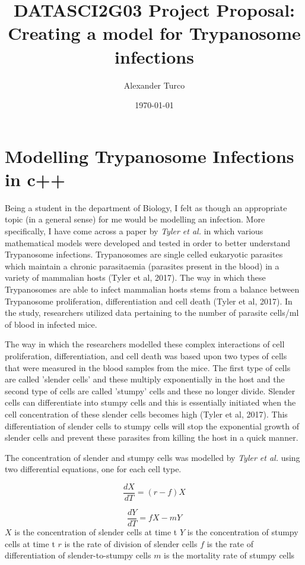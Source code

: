 \documentclass[11pt]{article}
\title{ DATASCI2G03 Project Proposal: Creating a model for Trypanosome infections }
\author{ Alexander Turco }
\date{\today}
\begin{document}
	\maketitle	
	\pagebreak
	
	
	
	\section{Modelling Trypanosome Infections in c++}
	
	Being a student in the department of Biology, I felt as though an appropriate topic (in a general sense) for me would be modelling an infection. More specifically, I have come across a paper by \emph{Tyler et al.} in which various mathematical models were developed and tested in order to better understand Trypanosome infections. Trypanosomes are single celled eukaryotic parasites which maintain a chronic parasitaemia (parasites present in the blood) in a variety of mammalian hosts (Tyler et al, 2017). The way in which these Trypanosomes are able to infect mammalian hosts stems from a balance between Trypanosome proliferation, differentiation and cell death (Tyler et al, 2017). In the study, researchers utilized data pertaining to the number of parasite cells/ml of blood in infected mice. 
	
	The way in which the researchers modelled these complex interactions of cell proliferation, differentiation, and cell death was based upon two types of cells that were measured in the blood samples from the mice. The first type of cells are called 'slender cells' and these multiply exponentially in the host and the second type of cells are called 'stumpy' cells and these no longer divide. Slender cells can differentiate into stumpy cells and this is essentially initiated when the cell concentration of these slender cells becomes high (Tyler et al, 2017). This differentiation of slender cells to stumpy cells will stop the exponential growth of slender cells and prevent these parasites from killing the host in a quick manner.
	
	The concentration of slender and stumpy cells was modelled by \emph{Tyler et al.} using two differential equations, one for each cell type.
	
	\[\frac{dX}{dT} = (r-f)X\]
	
	\[\frac{dY}{dT} = fX-mY\] 
	$X$ is the concentration of slender cells at time t \newline
	$Y$ is the concentration of stumpy cells at time t \newline
	$r$ is the rate of division of slender cells \newline
	$f$ is the rate of differentiation of slender-to-stumpy cells \newline
	$m$ is the mortality rate of stumpy cells \newline
	
\end{document}
